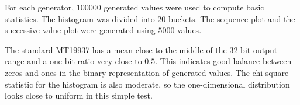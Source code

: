 \begin{table}[htbp]
\centering
\small
{}
\caption{Mersenne Twister variants used in the experiment}
\label{tab:mt-parameters}
\end{table}

For each generator, $100000$ generated values were used to compute basic statistics. The histogram was divided into $20$ buckets. The sequence plot and the successive-value plot were generated using $5000$ values.

\begin{table}[htbp]
\centering
\small
{}
\caption{Basic statistics computed from $100000$ outputs}
\label{tab:mt-statistics}
\end{table}

The standard MT19937 has a mean close to the middle of the 32-bit output range and a one-bit ratio very close to $0.5$. This indicates good balance between zeros and ones in the binary representation of generated values. The chi-square statistic for the histogram is also moderate, so the one-dimensional distribution looks close to uniform in this simple test.

